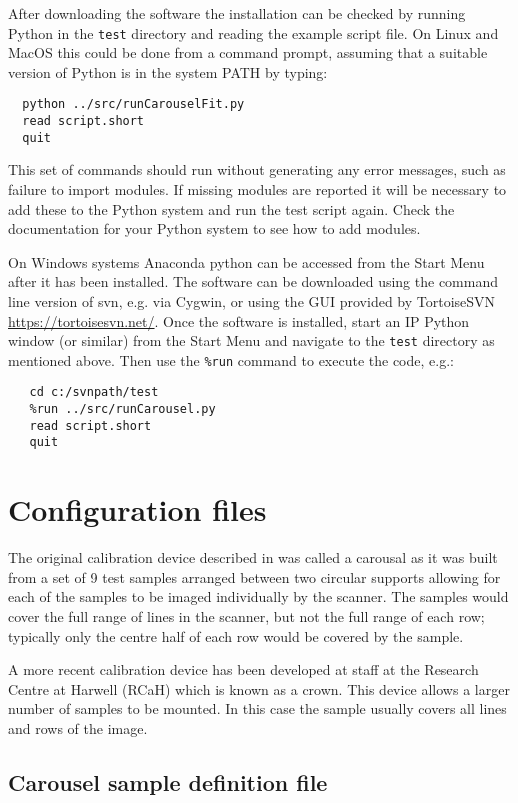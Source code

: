 \documentclass[a4paper,12pt]{article}
\begin{document}
After downloading the software the installation can be checked by running Python in the \texttt{test} directory
and reading the example script file.
On Linux and MacOS this could be done from a command prompt, assuming that a suitable version of Python is in the system PATH by typing:
\begin{verbatim}
  python ../src/runCarouselFit.py
  read script.short
  quit
\end{verbatim}

This set of commands should run without generating any error messages, such as failure to import modules.
If missing modules are reported it will be necessary to add these to the Python system and run the test script again.
Check the documentation for your Python system to see how to add modules.

On Windows systems Anaconda python can be accessed from the Start Menu after it has been installed.
The software can be downloaded using the command line version of svn, e.g. via Cygwin, or using the GUI
provided by TortoiseSVN \url{https://tortoisesvn.net/}.
Once the software is installed, start an IP Python window (or similar) from the Start Menu and navigate to the 
\texttt{test} directory as mentioned above. Then use the \texttt{\%run} command to execute the code, e.g.:
\begin{verbatim}
   cd c:/svnpath/test
   %run ../src/runCarousel.py
   read script.short
   quit
\end{verbatim}

\section{Configuration files}

The original calibration device described in \cite{davis} was called a carousal as it was built from a set of 9 test samples
arranged between two circular supports allowing for each of the samples to be imaged individually by the scanner.
The samples would cover the full range of lines in the scanner, but not the full range of each row; typically only
the centre half of each row would be covered by the sample.

A more recent calibration device has been developed at staff at the Research Centre at Harwell (RCaH) which is
known as a crown. This device allows a larger number of samples to be mounted.
In this case the sample usually covers all lines and rows of the image.

\subsection{Carousel sample definition file}
\end{document}
